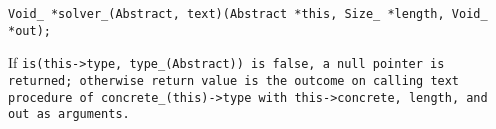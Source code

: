 
\tt{Void_ *solver_(Abstract, text)(Abstract *this, Size_ *length, Void_ *out);}


If \tt{is(this->type, type_(Abstract))} is \tt{false},
a null pointer is returned; otherwise return value is the outcome
on calling \tt{text} procedure of \tt{concrete_(this)->type}
with \tt{this->concrete}, \tt{length}, and \tt{out} as arguments.
